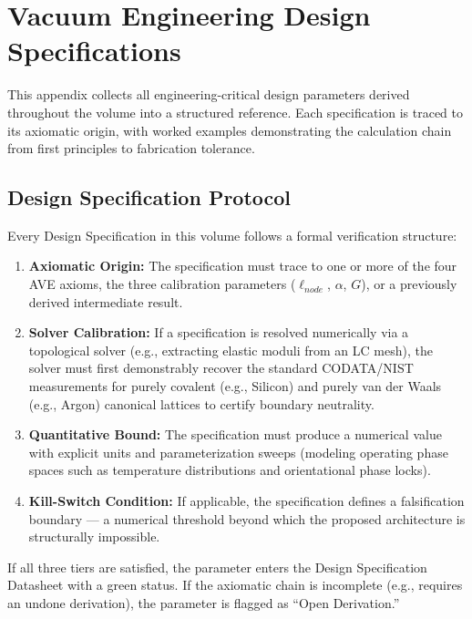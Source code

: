 \chapter{Vacuum Engineering Design Specifications}
\label{app:vacuum_eng}

This appendix collects all engineering-critical design parameters derived throughout the volume into a structured reference. Each specification is traced to its axiomatic origin, with worked examples demonstrating the calculation chain from first principles to fabrication tolerance.

\section{Design Specification Protocol}

Every Design Specification in this volume follows a formal verification structure:

\begin{enumerate}
    \item \textbf{Axiomatic Origin:} The specification must trace to one or more of the four AVE axioms, the three calibration parameters ($\ell_{node}$, $\alpha$, $G$), or a previously derived intermediate result.
    \item \textbf{Solver Calibration:} If a specification is resolved numerically via a topological solver (e.g., extracting elastic moduli from an LC mesh), the solver must first demonstrably recover the standard CODATA/NIST measurements for purely covalent (e.g., Silicon) and purely van der Waals (e.g., Argon) canonical lattices to certify boundary neutrality.
    \item \textbf{Quantitative Bound:} The specification must produce a numerical value with explicit units and parameterization sweeps (modeling operating phase spaces such as temperature distributions and orientational phase locks).
    \item \textbf{Kill-Switch Condition:} If applicable, the specification defines a falsification boundary --- a numerical threshold beyond which the proposed architecture is structurally impossible.
\end{enumerate}

\noindent If all three tiers are satisfied, the parameter enters the Design Specification Datasheet with a green status. If the axiomatic chain is incomplete (e.g., requires an undone derivation), the parameter is flagged as ``Open Derivation.''

